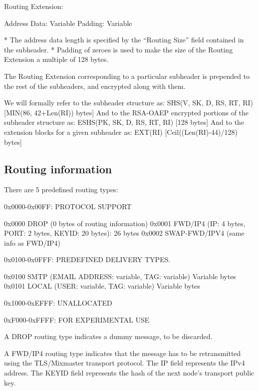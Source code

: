  Routing Extension:

    Address Data:     Variable
    Padding:          Variable

* The address data length is specified by the ``Routing Size'' field
  contained in the subheader.
* Padding of zeroes is used to make the size of the Routing Extension a
  multiple of 128 bytes.

The Routing Extension corresponding to a particular subheader is
prepended to the rest of the subheaders, and encrypted along with
them.

We will formally refer to the subheader structure as:
SHS(V, SK, D, RS, RT, RI)     [MIN(86, 42+Len(RI)) bytes] 
And to the RSA-OAEP encrypted portions of the subheader structure as:
ESHS(PK, SK, D, RS, RT, RI)   [128 bytes]
And to the extension blocks for a given subheader as:
EXT(RI)                       [Ceil((Len(RI)-44)/128) bytes]

\subsection{Routing information}

There are 5 predefined routing types:

0x0000-0x00FF: PROTOCOL SUPPORT

0x0000 DROP    (0 bytes of routing information)
0x0001 FWD/IP4 (IP: 4 bytes, PORT: 2 bytes, KEYID: 20 bytes): 26 bytes
0x0002 SWAP-FWD/IPV4 (same info as FWD/IP4)

0x0100-0x0FFF: PREDEFINED DELIVERY TYPES.

0x0100 SMTP   (EMAIL ADDRESS: variable, TAG: variable) Variable bytes
0x0101 LOCAL  (USER: variable, TAG: variable) Variable bytes

0x1000-0xEFFF: UNALLOCATED

0xF000-0xFFFF: FOR EXPERIMENTAL USE

A DROP routing type indicates a dummy message, to be discarded.

A FWD/IP4 routing type indicates that the message has to be
retransmitted using the TLS/Mixmaster transport protocol. The IP field
represents the IPv4 address.  The KEYID field represents the hash of
the next node's transport public key.

